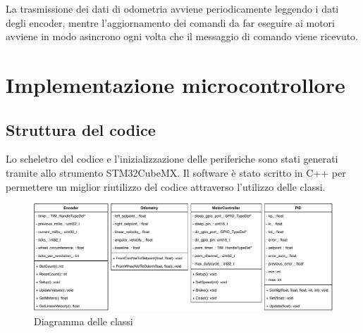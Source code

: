 La trasmissione dei dati di odometria avviene periodicamente leggendo i dati degli encoder, mentre l'aggiornamento dei comandi da far eseguire ai motori avviene in modo asincrono ogni volta che il messaggio di comando viene ricevuto.

\section{Implementazione microcontrollore}
\subsection{Struttura del codice}
Lo scheletro del codice e l'inizializzazione delle periferiche sono stati generati tramite allo strumento STM32CubeMX. Il software è stato scritto in C++ per permettere un miglior riutilizzo del codice attraverso l'utilizzo delle classi.

\begin{figure}[H]
    \centering
    \includegraphics[scale=0.64]{images/uml_classes.pdf}
    \caption{Diagramma delle classi}
\end{figure}


